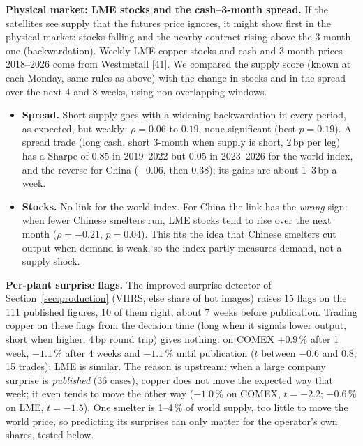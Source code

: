 \documentclass[10pt,a4paper]{article}
\begin{document}
\textbf{Physical market: LME stocks and the cash--3-month spread.} If the satellites see supply that the futures price ignores, it might show first in the physical market: stocks falling and the nearby contract rising above the 3-month one (backwardation). Weekly LME copper stocks and cash and 3-month prices 2018--2026 come from Westmetall [41]. We compared the supply score (known at each Monday, same rules as above) with the change in stocks and in the spread over the next 4 and 8 weeks, using non-overlapping windows.
\begin{itemize}[leftmargin=1.2em]
  \item \textbf{Spread.} Short supply goes with a widening backwardation in every period, as expected, but weakly: $\rho=0.06$ to $0.19$, none significant (best $p=0.19$). A spread trade (long cash, short 3-month when supply is short, 2\,bp per leg) has a Sharpe of $0.85$ in 2019--2022 but $0.05$ in 2023--2026 for the world index, and the reverse for China ($-0.06$, then $0.38$); its gains are about 1--3\,bp a week.
  \item \textbf{Stocks.} No link for the world index. For China the link has the \emph{wrong} sign: when fewer Chinese smelters run, LME stocks tend to rise over the next month ($\rho=-0.21$, $p=0.04$). This fits the idea that Chinese smelters cut output when demand is weak, so the index partly measures demand, not a supply shock.
\end{itemize}

\textbf{Per-plant surprise flags.} The improved surprise detector of Section~\ref{sec:production} (VIIRS, else share of hot images) raises 15 flags on the 111 published figures, 10 of them right, about 7 weeks before publication. Trading copper on these flags from the decision time (long when it signals lower output, short when higher, 4\,bp round trip) gives nothing: on COMEX $+0.9$\,\% after 1 week, $-1.1$\,\% after 4 weeks and $-1.1$\,\% until publication ($t$ between $-0.6$ and $0.8$, 15 trades); LME is similar. The reason is upstream: when a large company surprise is \emph{published} (36 cases), copper does not move the expected way that week; it even tends to move the other way ($-1.0$\,\% on COMEX, $t=-2.2$; $-0.6$\,\% on LME, $t=-1.5$). One smelter is 1--4\,\% of world supply, too little to move the world price, so predicting its surprises can only matter for the operator's own shares, tested below.
\end{document}
